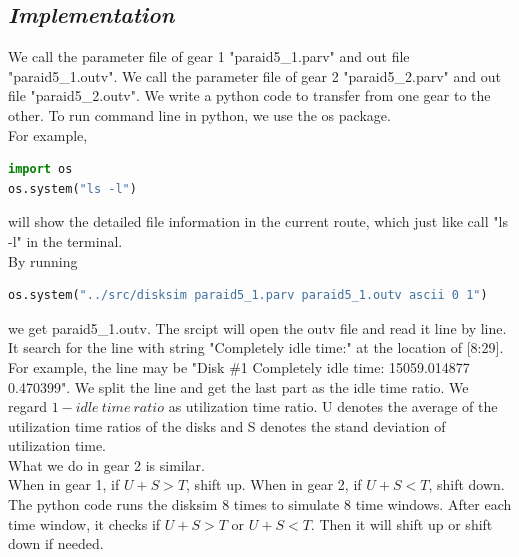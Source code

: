 \documentclass[conference]{IEEEtran}
\begin{document}
\subsection{\emph{\textbf{Implementation}}}
We call the parameter file of gear 1 "paraid5\_1.parv" and out file "paraid5\_1.outv". We call the parameter file of gear 2 "paraid5\_2.parv" and out file "paraid5\_2.outv". We write a python code to transfer from one gear to the other. To run command line in python, we use the os package.\\
For example,
\lstset{flexiblecolumns,showstringspaces=false,numbers=left,numberstyle=\footnotesize,frame=single,breaklines=ture}
\begin{lstlisting}[language=Python]
import os
os.system("ls -l")
\end{lstlisting}
will show the detailed file information in the current route, which just like call "ls -l" in the terminal.\\
By running
\begin{lstlisting}[language=Python]
os.system("../src/disksim paraid5_1.parv paraid5_1.outv ascii 0 1")
\end{lstlisting}
we get paraid5\_1.outv. The srcipt will open the outv file and read it line by line. It search for the line with string "Completely idle time:" at the location of [8:29]. For example, the line may be "Disk \#1 Completely idle time:  	15059.014877   	0.470399". We split the line and get the last part as the idle time ratio. We regard $1-idle\ time\ ratio$ as utilization time ratio. U denotes the average of the utilization time ratios of the disks and S denotes the stand deviation of utilization time.\\
What we do in gear 2 is similar.\\
When in gear 1, if $U+S>T$, shift up. When in gear 2, if $U+S<T$, shift down.\\
The python code runs the disksim 8 times to simulate 8 time windows. After each time window, it checks if $U+S>T$ or $U+S<T$. Then it will shift up or shift down if needed.
\end{document}

